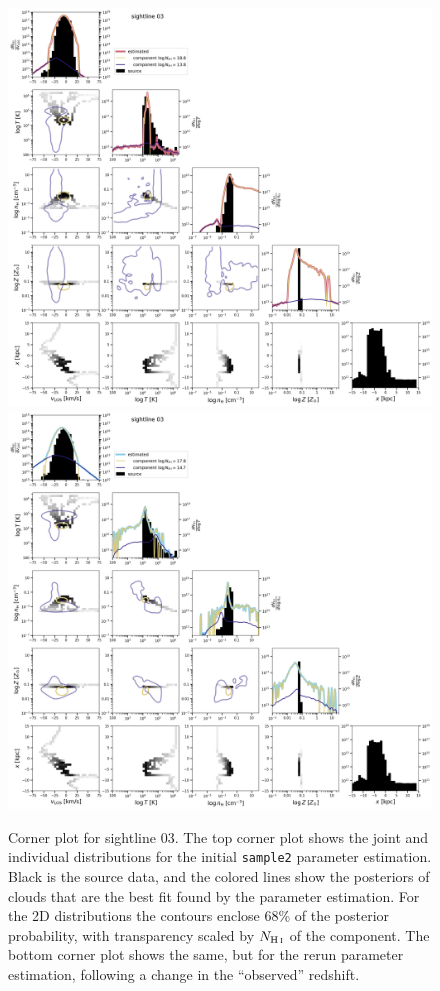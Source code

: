\documentclass[fleqn,usenatbib]{mnras}
\begin{document}
\begin{figure}
    \centering
    \includegraphics[height=0.45\textheight]{figures/sample2/original/sightline_0003.png}
    \includegraphics[height=0.45\textheight]{figures/sample2/high-z/sightline_0003.png}
    \caption{Corner plot for sightline 03.
    The top corner plot shows the joint and individual distributions for the initial \texttt{sample2} parameter estimation.
    Black is the source data, and the colored lines show the posteriors of clouds that are the best fit found by the parameter estimation.
    For the 2D distributions the contours enclose 68\% of the posterior probability, with transparency scaled by $N_{\ion{H}{I}}$ of the component.
    The bottom corner plot shows the same, but for the rerun parameter estimation, following a change in the ``observed'' redshift.}
    \label{f: sample2 corner 03}
\end{figure}
\end{document}
